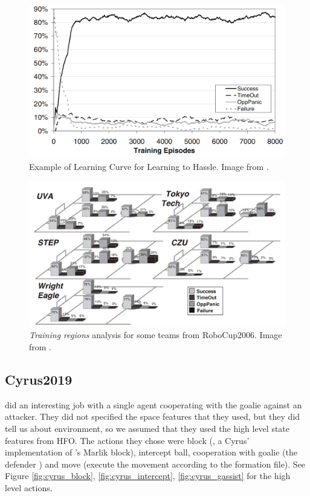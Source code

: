 \begin{figure}[H]
    \centering
    \includegraphics[scale=0.25]{images/neurohassleR1.png}
    \caption{Example of Learning Curve for Learning to Hassle. Image from \cite{neurohassle}.}
    \label{fig:neurohassleR1}
\end{figure}

\begin{figure}[H]
    \centering
    \includegraphics[scale=0.25]{images/neurohassleR2.png}
    \caption{\textit{Training regions} analysis for some teams from RoboCup2006. Image from \cite{neurohassle}.}
    \label{fig:neurohassleR2}
\end{figure}

\subsection{Cyrus2019}
\cite{cyrus} did an interesting job with a single agent cooperating with the goalie against an attacker. They did not specified the space features that they used, but they did tell us about \cite{hfo} environment, so we assumed that they used the high level state features from HFO. The actions they chose were block (\cite{cyrus2014}, a Cyrus' implementation of \cite{marlik2011}'s  Marlik block), intercept ball, cooperation with goalie (the defender ) and move (execute the movement according to the formation file). See Figure \ref{fig:cyrus_block}, \ref{fig:cyrus_intercept}, \ref{fig:cyrus_gassist} for the high level actions. 

